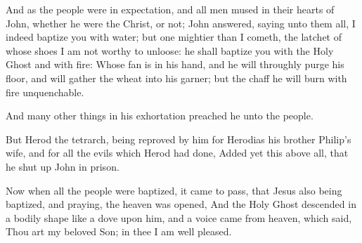 \verse And as the people were in expectation, and all men mused in their hearts of John, whether he were the Christ, or not; \verse John answered, saying unto them all, I indeed baptize you with water; but one mightier than I cometh, the latchet of whose shoes I am not worthy to unloose: he shall baptize you with the Holy Ghost and with fire: \verse Whose fan is in his hand, and he will throughly purge his floor, and will gather the wheat into his garner; but the chaff he will burn with fire unquenchable.

\verse And many other things in his exhortation preached he unto the people.

\verse But Herod the tetrarch, being reproved by him for Herodias his brother Philip's wife, and for all the evils which Herod had done, \verse Added yet this above all, that he shut up John in prison.

\verse Now when all the people were baptized, it came to pass, that Jesus also being baptized, and praying, the heaven was opened, \verse And the Holy Ghost descended in a bodily shape like a dove upon him, and a voice came from heaven, which said, Thou art my beloved Son; in thee I am well pleased.

